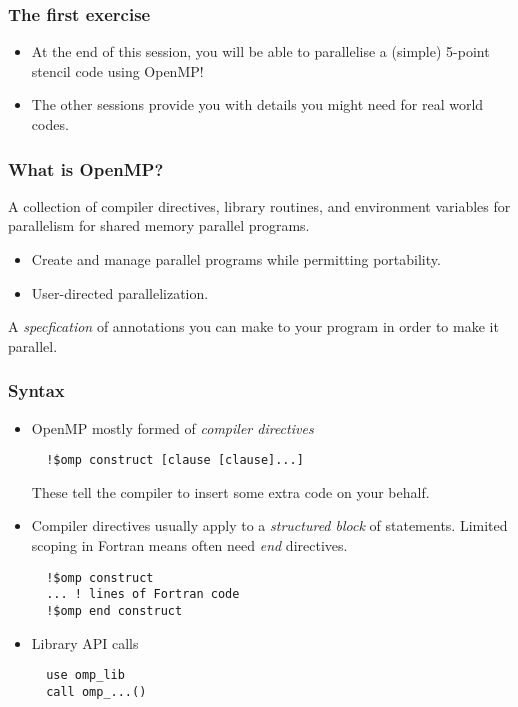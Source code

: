 \documentclass{beamer}
\begin{document}
\begin{frame}
\frametitle{The first exercise}
\begin{itemize}
  \item At the end of this session, you will be able to parallelise a (simple) 5-point stencil code using OpenMP!
  \item The other sessions provide you with details you might need for real world codes.
\end{itemize}
\end{frame}

\begin{frame}
\frametitle{What is OpenMP?}

A collection of compiler directives, library routines, and environment variables for parallelism for shared memory parallel programs.

\begin{itemize}
  \item Create and manage parallel programs while permitting portability.
  \item User-directed parallelization.
\end{itemize}

A \emph{specfication} of annotations you can make to your program in order to make it parallel.

\end{frame}

\begin{frame}[fragile]
\frametitle{Syntax}
\begin{itemize}
\item OpenMP mostly formed of \emph{compiler directives}\\
  \begin{verbatim}
  !$omp construct [clause [clause]...]
  \end{verbatim}
  These tell the compiler to insert some extra code on your behalf.

\item Compiler directives usually apply to a \emph{structured block} of statements.
Limited scoping in Fortran means often need \emph{end} directives.
  \begin{verbatim}
  !$omp construct
  ... ! lines of Fortran code
  !$omp end construct
  \end{verbatim}

\item Library API calls
  \begin{verbatim}
  use omp_lib
  call omp_...()
  \end{verbatim}

\end{itemize}
\end{frame}
\end{document}
